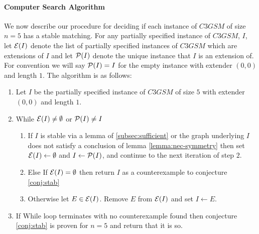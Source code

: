 \paragraph{Computer Search Algorithm}
We now describe our procedure for deciding if each instance of $C3GSM$ of size $n=5$ has a stable matching. For any partially specified instance of $C3GSM$, $I$, let $\mathcal{E}(I)$ denote the list of partially specified instances of $C3GSM$ which are extensions of $I$ and let $\mathcal{P}(I)$ denote the unique instance that $I$ is an extension of. For convention we will say $\mathcal{P}(I) = I$ for the empty instance with extender $(0,0)$ and length $1$. The algorithm is as follows:
\begin{enumerate}
\item Let $I$ be the partially specified instance of $C3GSM$ of size $5$ with extender $(0,0)$ and length $1$.
\item While $\mathcal{E}(I) \neq \emptyset$ or $\mathcal{P}(I) \neq I$
	\begin{enumerate}
	\item If $I$ is stable via a lemma of \ref{subsec:sufficient} or the graph underlying $I$ does not satisfy a conclusion of lemma \ref{lemma:nec-symmetry} then set $\mathcal{E}(I) \leftarrow \emptyset$ and $I \leftarrow \mathcal{P}(I)$, and continue to the next iteration of step $2$.
	\item Else If $\mathcal{E}(I) = \emptyset$ then return $I$ as a counterexample to conjecture \ref{conj:stab}
	\item Otherwise let $E \in \mathcal{E}(I)$. Remove $E$ from $\mathcal{E}(I)$ and set $I \leftarrow E$. 
	\end{enumerate}
\item If While loop terminates with no counterexample found then conjecture \ref{conj:stab} is proven for $n=5$ and return that it is so.
\end{enumerate}
